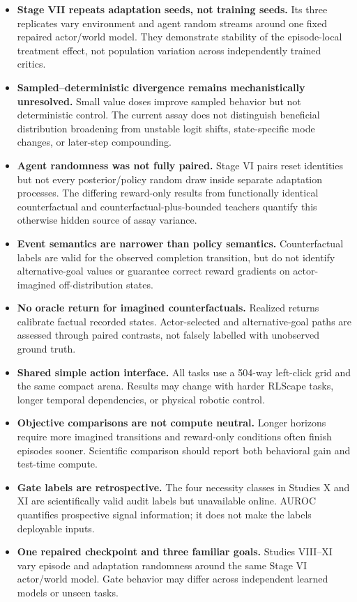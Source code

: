 \documentclass[10pt]{article}
\begin{document}
\begin{itemize}
  \item \textbf{Stage VII repeats adaptation seeds, not training seeds.} Its three replicates vary environment and agent random streams around one fixed repaired actor/world model. They demonstrate stability of the episode-local treatment effect, not population variation across independently trained critics.
  \item \textbf{Sampled--deterministic divergence remains mechanistically unresolved.} Small value doses improve sampled behavior but not deterministic control. The current assay does not distinguish beneficial distribution broadening from unstable logit shifts, state-specific mode changes, or later-step compounding.
  \item \textbf{Agent randomness was not fully paired.} Stage VI pairs reset identities but not every posterior/policy random draw inside separate adaptation processes. The differing reward-only results from functionally identical counterfactual and counterfactual-plus-bounded teachers quantify this otherwise hidden source of assay variance.
  \item \textbf{Event semantics are narrower than policy semantics.} Counterfactual labels are valid for the observed completion transition, but do not identify alternative-goal values or guarantee correct reward gradients on actor-imagined off-distribution states.
  \item \textbf{No oracle return for imagined counterfactuals.} Realized returns calibrate factual recorded states. Actor-selected and alternative-goal paths are assessed through paired contrasts, not falsely labelled with unobserved ground truth.
  \item \textbf{Shared simple action interface.} All tasks use a 504-way left-click grid and the same compact arena. Results may change with harder RLScape tasks, longer temporal dependencies, or physical robotic control.
  \item \textbf{Objective comparisons are not compute neutral.} Longer horizons require more imagined transitions and reward-only conditions often finish episodes sooner. Scientific comparison should report both behavioral gain and test-time compute.
  \item \textbf{Gate labels are retrospective.} The four necessity classes in Studies X and XI are scientifically valid audit labels but unavailable online. AUROC quantifies prospective signal information; it does not make the labels deployable inputs.
  \item \textbf{One repaired checkpoint and three familiar goals.} Studies VIII--XI vary episode and adaptation randomness around the same Stage VI actor/world model. Gate behavior may differ across independent learned models or unseen tasks.

\end{itemize}
\end{document}
